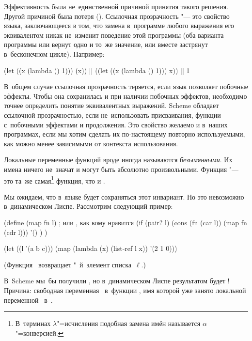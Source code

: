 Эффективность была не~единственной причиной принятия такого решения. Другой
причиной была потеря  (). Ссылочная прозрачность "--- это свойство языка, заключающееся
в том, что замена в~программе любого выражения его эквивалентом никак не~изменит
поведение этой программы (оба варианта программы или вернут одно и то~же
значение, или вместе застрянут в~бесконечном цикле). Например:

\begin{code:lisp}
(let ((x (lambda () 1))) (x)) |\eq| ((let ((x (lambda () 1))) x)) |\eq| 1
\end{code:lisp}

В~общем случае ссылочная прозрачность теряется, если язык позволяет побочные
эффекты. Чтобы она сохранилась и при наличии побочных эффектов, необходимо
точнее определить понятие эквивалентных выражений. Scheme обладает ссылочной
прозрачностью, если не~использовать присваивания, функции с~побочными эффектами
и продолжения.  Это свойство желаемо и в~наших
программах, если мы хотим сделать их по-настоящему повторно используемыми, как
можно менее зависимыми от контекста использования.

Локальные переменные функций вроде  иногда называются
\emph{безымянными}. Их имена ничего не~значат и могут быть абсолютно
произвольными. Функция  "--- это та~же
самая\footnote{В~терминах $\lambda$"=исчисления подобная замена имён называется
$\alpha$"=конверсией.} функция, что и .

Мы ожидаем, что в~языке будет сохраняться этот инвариант. Но это невозможно
в~динамическом Лиспе. Рассмотрим следующий пример:

\begin{code:lisp}
(define (map fn l)  ; или , как кому нравится
  (if (pair? l)
      (cons (fn (car l)) (map fn (cdr l)))
      '() ) )

(let ((l '(a b c)))
  (map (lambda (x) (list-ref l x))
       '(2 1 0)))
\end{code:lisp}

(Функция~ возвращает "~й~элемент
списка~$\ell$.)

В~Scheme мы~бы получили , но в~динамическом Лиспе результатом будет
! Причина: свободная переменная~ в~функции , имя которой уже занято локальной переменной~
в~.

